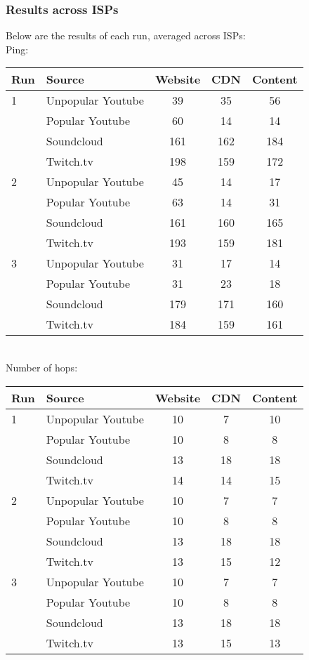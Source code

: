 \documentclass{sig-alternate-05-2015}
\begin{document}
\subsubsection{Results across ISPs}
Below are the results of each run, averaged across ISPs:
\vspace{1em} \\
Ping: \\
\begin{tabular}{|l|l|c|c|c|} \hline
Run & Source & Website & CDN & Content \\ \hline
1 & Unpopular Youtube & 39  & 35  & 56  \\ \hline
  & Popular Youtube   & 60  & 14  & 14  \\ \hline
  & Soundcloud        & 161 & 162 & 184 \\ \hline
  & Twitch.tv         & 198 & 159 & 172 \\ \hline
2 & Unpopular Youtube & 45  & 14  & 17  \\ \hline
  & Popular Youtube   & 63  & 14  & 31  \\ \hline
  & Soundcloud        & 161 & 160 & 165 \\ \hline
  & Twitch.tv         & 193 & 159 & 181 \\ \hline
3 & Unpopular Youtube & 31  & 17  & 14  \\ \hline
  & Popular Youtube   & 31  & 23  & 18  \\ \hline
  & Soundcloud        & 179 & 171 & 160 \\ \hline
  & Twitch.tv         & 184 & 159 & 161 \\ \hline
\end{tabular}
\vspace{1em} \\
Number of hops: \\
\begin{tabular}{|l|l|c|c|c|} \hline
Run & Source & Website & CDN & Content \\ \hline
1 & Unpopular Youtube & 10 & 7  & 10 \\ \hline
  & Popular Youtube   & 10 & 8  & 8  \\ \hline
  & Soundcloud        & 13 & 18 & 18 \\ \hline
  & Twitch.tv         & 14 & 14 & 15 \\ \hline
2 & Unpopular Youtube & 10 & 7  & 7  \\ \hline
  & Popular Youtube   & 10 & 8  & 8  \\ \hline
  & Soundcloud        & 13 & 18 & 18 \\ \hline
  & Twitch.tv         & 13 & 15 & 12 \\ \hline
3 & Unpopular Youtube & 10 & 7  & 7  \\ \hline
  & Popular Youtube   & 10 & 8  & 8  \\ \hline
  & Soundcloud        & 13 & 18 & 18 \\ \hline
  & Twitch.tv         & 13 & 15 & 13 \\ \hline
\end{tabular}
\end{document}
